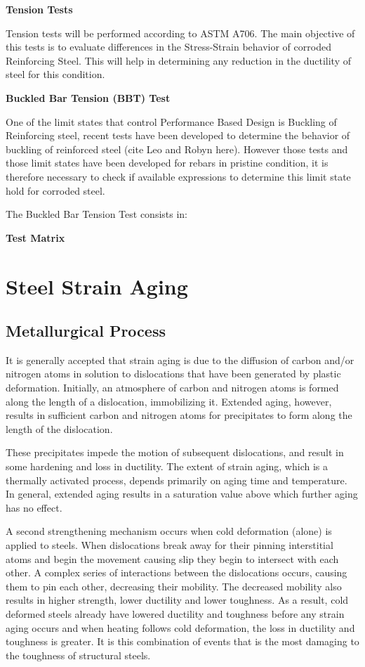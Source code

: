 \textbf{Tension Tests}

Tension tests will be performed according to ASTM A706. The main objective of this tests is to evaluate differences in the Stress-Strain behavior of corroded Reinforcing Steel. This will help in determining any reduction in the ductility of steel for this condition.

\textbf{Buckled Bar Tension (BBT) Test}

One of the limit states that control Performance Based Design is Buckling of Reinforcing steel, recent tests have been developed to determine the behavior of buckling of reinforced steel (cite Leo and Robyn here). However those tests and those limit states have been developed for rebars in pristine condition, it is therefore necessary to check if available expressions to determine this limit state hold for corroded steel.

The Buckled Bar Tension Test consists in:

\textbf{Test Matrix}



\section{Steel Strain Aging}

\subsection{Metallurgical Process}

It is generally accepted that strain aging is due to the diffusion of carbon and/or nitrogen atoms in solution to dislocations that have been generated by plastic deformation. Initially, an atmosphere of carbon and nitrogen atoms is formed along the length of a dislocation, immobilizing it. Extended aging, however, results in sufficient carbon and nitrogen atoms for precipitates to form along the length of the dislocation.

These precipitates impede the motion of subsequent dislocations, and result in some hardening and loss in ductility. The extent of strain aging, which is a thermally activated process, depends primarily on aging time and temperature. In general, extended aging results in a saturation value above which further aging has no effect.

A second strengthening mechanism occurs when cold deformation (alone) is applied to steels. When dislocations break away for their pinning interstitial atoms and begin the movement causing slip they begin to intersect with each other. A complex series of interactions between the dislocations occurs, causing them to pin each other, decreasing their mobility. The decreased mobility also results in higher strength, lower ductility and lower toughness. As a result, cold deformed steels already have lowered ductility and toughness before any strain aging occurs and when heating follows cold deformation, the loss in ductility and toughness is greater. It is this combination of events that is the most damaging to the toughness of structural steels.

